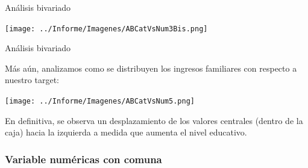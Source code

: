 \documentclass[pdf]{beamer}
\begin{document}
\begin{frame}{Análisis bivariado}

    \begin{center}
        \texttt{[image: ../Informe/Imagenes/ABCatVsNum3Bis.png]}
    \end{center}
\end{frame}
 
 
 




\begin{frame}{Análisis bivariado}

    Más aún, analizamos como se distribuyen los ingresos familiares con respecto a nuestro target:

    \begin{center}
        \texttt{[image: ../Informe/Imagenes/ABCatVsNum5.png]}
    \end{center}

    En definitiva, se observa un desplazamiento de los valores centrales (dentro de la caja) hacia la izquierda a medida que aumenta el nivel educativo.


\end{frame}

    \subsubsection{Variable numéricas con comuna}
\end{document}
